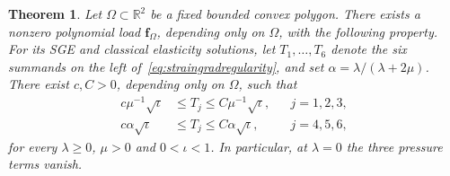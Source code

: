 \documentclass[10pt]{amsart}
\newtheorem{theorem}{Theorem}[section]
\numberwithin{equation}{section}
\begin{document}
\begin{theorem}\label{thm:polygon-sharpness}
Let $\Omega\subset\mathbb R^2$ be a fixed bounded convex polygon. There exists a nonzero polynomial load $\boldsymbol f_\Omega$, depending only on $\Omega$, with the following property. For its SGE and classical elasticity solutions, let $T_1,\ldots,T_6$ denote the six summands on the left of~\eqref{eq:straingradregularity}, and set $\alpha=\lambda/(\lambda+2\mu)$. There exist $c,C>0$, depending only on $\Omega$, such that
\[
\begin{aligned}
c\mu^{-1}\sqrt\iota&\leq T_j\leq C\mu^{-1}\sqrt\iota,
&&j=1,2,3,\\
c\alpha\sqrt\iota&\leq T_j\leq C\alpha\sqrt\iota,
&&j=4,5,6,
\end{aligned}
\]
for every $\lambda\geq0$, $\mu>0$ and $0<\iota<1$. In particular, at $\lambda=0$ the three pressure terms vanish.
\end{theorem}
\end{document}
